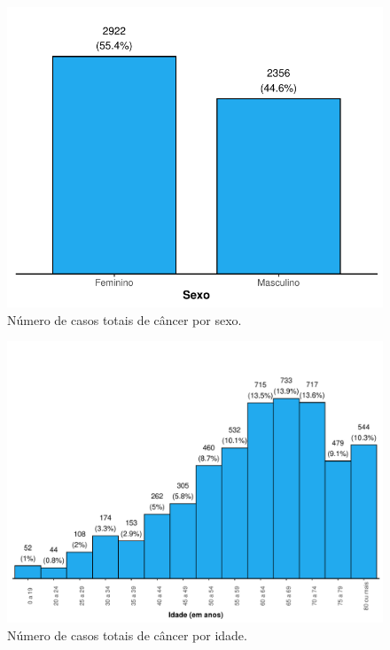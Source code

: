 \documentclass[a4paper]{modeloLEA} %
\begin{document}
\begin{figure}[h]

{\centering \includegraphics{relatorio_files/figure-latex/sexo-1} 

}

\caption{\label{fig:sexo}Número de casos totais de câncer por sexo.}\label{fig:sexo}
\end{figure}

\begin{figure}[h]

{\centering \includegraphics[width=0.8\linewidth]{relatorio_files/figure-latex/idade-1} 

}

\caption{\label{fig:idade}Número de casos totais de câncer por idade.}\label{fig:idade}
\end{figure}
\end{document}
